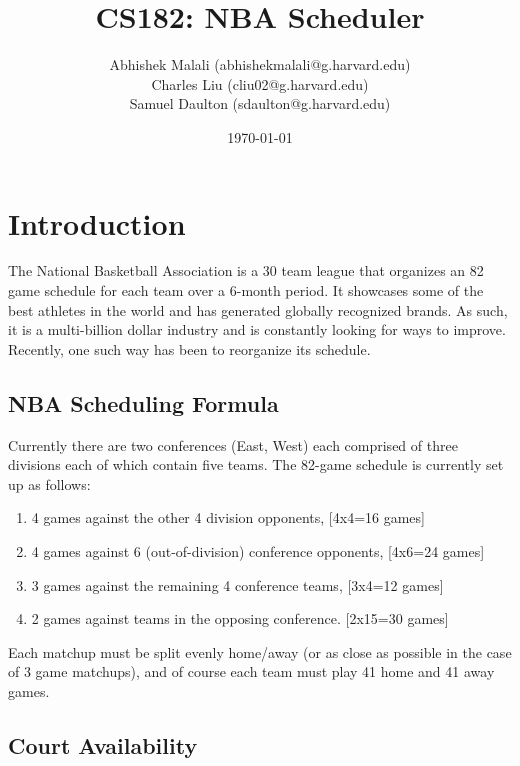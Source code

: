 \documentclass{article}
\begin{document}
	\title{CS182: NBA Scheduler}
	\author{Abhishek Malali (abhishekmalali@g.harvard.edu)\\
			Charles Liu (cliu02@g.harvard.edu)\\
			Samuel Daulton (sdaulton@g.harvard.edu)}
	\date{\today}
	\maketitle

	\section{Introduction}

	The National Basketball Association is a 30 team league that organizes an 82 game schedule for each team over a 6-month period. It showcases some of the best athletes in the world and has generated globally recognized brands. As such, it is a multi-billion dollar industry and is constantly looking for ways to improve. Recently, one such way has been to reorganize its schedule.

	\subsection{NBA Scheduling Formula}

	Currently there are two conferences (East, West) each comprised of three divisions each of which contain five teams. The 82-game schedule is currently set up as follows:

	\begin{enumerate}
		\item 4 games against the other 4 division opponents, [4x4=16 games]
		\item 4 games against 6 (out-of-division) conference opponents, [4x6=24 games]
		\item 3 games against the remaining 4 conference teams, [3x4=12 games]
		\item 2 games against teams in the opposing conference. [2x15=30 games]
	\end{enumerate}

	Each matchup must be split evenly home/away (or as close as possible in the case of 3 game matchups), and of course each team must play 41 home and 41 away games.

	\subsection{Court Availability}
\end{document}
